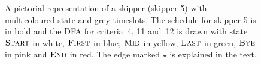 \documentclass{llncs}
\newcommand{\START}{\textnormal{\textsc{Start}}}
\newcommand{\FIRST}{\textnormal{\textsc{First}}}
\newcommand{\MID}{\textnormal{\textsc{Mid}}}
\newcommand{\LAST}{\textnormal{\textsc{Last}}}
\newcommand{\END}{\textnormal{\textsc{End}}}
\newcommand{\BYE}{\textnormal{\textsc{Bye}}}
\begin{document}
\begin{figure}[tb]
    \caption{A pictorial representation of a skipper (skipper 5) with multicoloured state and grey
        timeslots. The schedule for skipper 5 is in bold and the DFA for
        criteria~4, 11 and~12 is drawn with state $\START$ in white, $\FIRST$ in blue, $\MID$ in
        yellow, $\LAST$ in green, $\BYE$ in pink and $\END$ in red. The edge
        marked $\star$ is explained in the text.}\label{skipper5}
\end{figure}
\end{document}
